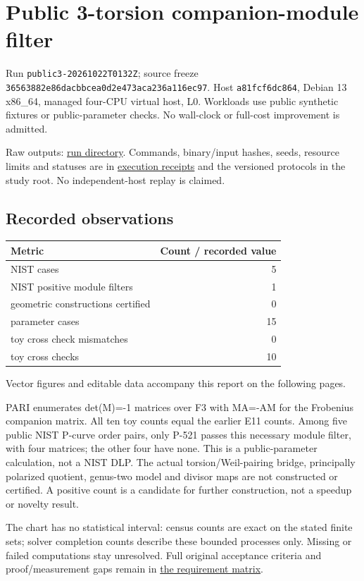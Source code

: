 \documentclass[
  10pt,
  letterpaper,
  landscape]{article}
\author{}
\date{}
\begin{document}
\section{Public 3-torsion companion-module
filter}\label{public-3-torsion-companion-module-filter}

Run \texttt{public3-20261022T0132Z}; source freeze
\texttt{36563882e86dacbbcea0d2e473aca236a116ec97}. Host
\texttt{a81fcf6dc864}, Debian 13 x86\_64, managed four-CPU virtual host,
L0. Workloads use public synthetic fixtures or public-parameter checks.
No wall-clock or full-cost improvement is admitted.

Raw outputs:
\href{../../../execution-v1/runs/public3-20261022T0132Z/}{run
directory}. Commands, binary/input hashes, seeds, resource limits and
statuses are in \href{../../../execution-v1/}{execution receipts} and
the versioned protocols in the study root. No independent-host replay is
claimed.

\subsection{Recorded observations}\label{recorded-observations}

\begin{longtable}[]{@{}lr@{}}
\toprule\noalign{}
Metric & Count / recorded value \\
\midrule\noalign{}
\endhead
\bottomrule\noalign{}
\endlastfoot
NIST cases & 5 \\
NIST positive module filters & 1 \\
geometric constructions certified & 0 \\
parameter cases & 15 \\
toy cross check mismatches & 0 \\
toy cross checks & 10 \\
\end{longtable}

Vector figures and editable data accompany this report on the following pages.

PARI enumerates det(M)=-1 matrices over F3 with MA=-AM for the Frobenius
companion matrix. All ten toy counts equal the earlier E11 counts. Among
five public NIST P-curve order pairs, only P-521 passes this necessary
module filter, with four matrices; the other four have none. This is a
public-parameter calculation, not a NIST DLP. The actual
torsion/Weil-pairing bridge, principally polarized quotient, genus-two
model and divisor maps are not constructed or certified. A positive
count is a candidate for further construction, not a speedup or novelty
result.

The chart has no statistical interval: census counts are exact on the
stated finite sets; solver completion counts describe these bounded
processes only. Missing or failed computations stay unresolved. Full
original acceptance criteria and proof/measurement gaps remain in
\href{../../../EXPERIMENTS.md}{the requirement matrix}.
\end{document}
